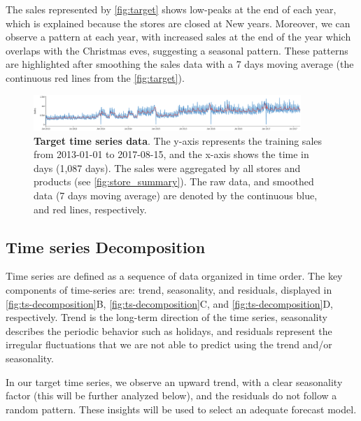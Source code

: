 The sales represented by \autoref{fig:target} shows low-peaks at the end of each year, which is explained because the stores are closed at New years. Moreover, we can observe a pattern at each year, with increased sales at the end of the year which overlaps with the Christmas eves, suggesting a seasonal pattern. These patterns are highlighted after smoothing the sales data  with a 7 days moving average (the continuous red lines from the \autoref{fig:target}).

\begin{figure}[!htb]
  \centering
  \includegraphics[width=0.9\textwidth]{plots/eda/target-time-series-plot-DF-testProc.png}
  \caption[Target time series data]{\textbf{Target time series data}. The y-axis represents the training sales from 2013-01-01 to 2017-08-15, and the x-axis shows the time in days (1,087 days). The sales were aggregated by all stores and products (see \autoref{fig:store_summary}). The raw data, and smoothed data (7 days moving average) are denoted by the continuous blue, and red lines, respectively.}
  \label{fig:target}
\end{figure}

\subsection[Time series Decomposition]{Time series Decomposition}
\label{sec:decomposition}

Time series are defined as a sequence of data organized in time order. The key components of time-series are: trend, seasonality, and residuals, displayed in \autoref{fig:ts-decomposition}B, \autoref{fig:ts-decomposition}C, and \autoref{fig:ts-decomposition}D, respectively. Trend is the long-term direction of the time series, seasonality describes the periodic behavior such as holidays, and residuals represent the irregular fluctuations that we are not able to predict using the trend and/or seasonality. 

In our target time series, we observe an upward trend, with a clear seasonality factor (this will be further analyzed below), and the residuals do not follow a random pattern. These insights will be used to select an adequate forecast model. 

